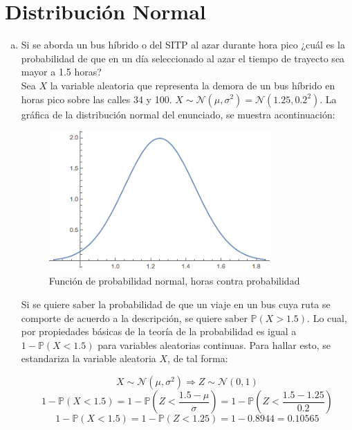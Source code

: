 \documentclass[11pt, spanish]{article}
\begin{document}
\pagebreak
\section{Distribución Normal}

\begin{enumerate}[(a)]

\item Si se aborda un bus híbrido o del SITP al azar durante hora pico ¿cuál es la
probabilidad de que en un día seleccionado al azar el tiempo de trayecto sea mayor a 1.5
horas?\\

Sea $X$ la variable aleatoria que representa la demora de un bus híbrido en horas pico sobre las calles 34 y 100. $X \sim \mathcal{N} (\mu , \sigma ^2) = \mathcal{N} (1.25, 0.2^2)$. La gráfica de la distribución normal del enunciado, se muestra acontinuación:

\begin{figure}[h]
    \centering
    \includegraphics[width=0.8\textwidth]{fig3-1.png}
    \caption{Función de probabilidad normal, horas contra probabilidad}
    \label{fig:prob_dist1}
\end{figure}

Si se quiere saber la probabilidad de que un viaje en un bus cuya ruta se comporte de acuerdo a la descripción, se quiere saber $\mathbb{P}(X > 1.5)$. Lo cual, por propiedades básicas de la teoría de la probabilidad es igual a $1 - \mathbb{P}(X < 1.5)$ para variables aleatorias continuas. Para hallar esto, se estandariza la variable aleatoria $X$, de tal forma:

$$X \sim \mathcal{N} (\mu , \sigma ^2) \Rightarrow Z \sim \mathcal{N} (0,  1)$$
$$1 - \mathbb{P}(X < 1.5) = 1 - \mathbb{P}\left(Z < \frac{1.5 - \mu}{\sigma}\right) = 1 - \mathbb{P}\left(Z < \frac{1.5 - 1.25}{0.2}\right)$$
$$1 - \mathbb{P}(X < 1.5) = 1 - \mathbb{P}\left(Z < 1.25 \right) = 1 - 0.8944 = 0.10565$$


\end{enumerate}
\end{document}
